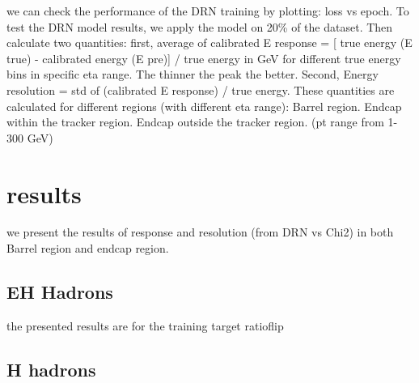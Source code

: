we can check the performance of the DRN training by plotting: loss vs epoch. To test the DRN model results, we apply the model on 20\% of the dataset. Then calculate two quantities: first, average of calibrated E response = [ true energy (E true) - calibrated energy (E pre)] / true energy in GeV for different true energy bins in specific eta range. The thinner the peak the better. 
Second, Energy resolution = std of (calibrated E response) / true energy. These quantities are calculated for different regions (with different eta range): Barrel region. Endcap within the tracker region. Endcap outside the tracker region. (pt range from 1-300 GeV)

\section{results}
we present the results of response and resolution (from DRN vs Chi2) in  both Barrel region and endcap region.

\subsection{EH Hadrons}
the presented results are for the training target ratioflip





\subsection{H hadrons}




